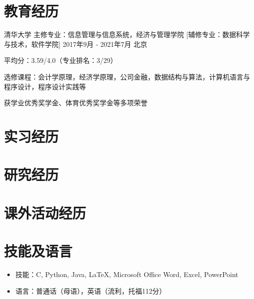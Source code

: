 \documentclass{resumeZH}
\begin{document}

\section{教育经历}
\Experience
{清华大学}
{主修专业：信息管理与信息系统，经济与管理学院}
[辅修专业：数据科学与技术，软件学院]
{2017年9月 - 2021年7月}
{北京}{
    \item 平均分：3.59/4.0（专业排名：3/29）
    \item 选修课程：会计学原理，经济学原理，公司金融，数据结构与算法，计算机语言与程序设计，程序设计实践等
    \item 获学业优秀奖学金、体育优秀奖学金等多项荣誉
}

\section{实习经历}

\summitview

\section{研究经历}

\fifaresearch

\section{课外活动经历}

\cydp

\tkd

\semtech

\section{技能及语言}
\vspace{0.618ex}
\begin{itemize}
    \item 技能：C, Python, Java, {\LaTeX}, Microsoft Office Word, Excel, PowerPoint
    \item 语言：普通话（母语），英语（流利，托福112分）
\end{itemize}
\end{document}
